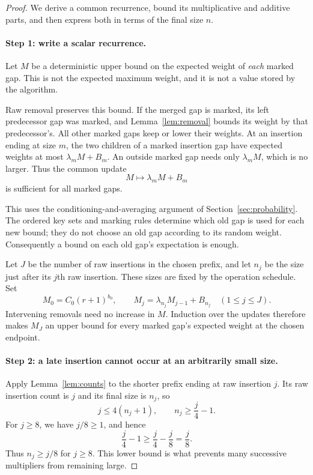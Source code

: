 \documentclass[11pt,a4paper]{article}
\theoremstyle{readable}
\begin{document}
\begin{proof}
We derive a common recurrence, bound its multiplicative and additive
parts, and then express both in terms of the final size $n$.

\paragraph{Step 1: write a scalar recurrence.}
Let $M$ be a deterministic upper bound on the expected weight of
\emph{each} marked gap. This is not the expected maximum weight,
and it is not a value stored by the algorithm.

Raw removal preserves this bound. If the merged gap is marked, its
left predecessor gap was marked, and Lemma~\ref{lem:removal} bounds
its weight by that predecessor's. All other marked gaps keep or lower
their weights. At an insertion ending at size $m$, the two children
of a marked insertion gap have expected weights at most
$\lambda_m M+B_m$. An outside marked gap needs only $\lambda_m M$,
which is no larger. Thus the common update
\[
  M\longmapsto\lambda_m M+B_m
\]
is sufficient for all marked gaps.

This uses the conditioning-and-averaging argument of
Section~\ref{sec:probability}. The ordered key sets and marking rules
determine which old gap is used for each new bound; they do not choose
an old gap according to its random weight. Consequently a bound on
each old gap's expectation is enough.

Let $J$ be the number of raw insertions in the chosen prefix, and let
$n_j$ be the size just after its $j$th raw insertion. These sizes are
fixed by the operation schedule. Set
\begin{equation}
  M_0=C_0(r+1)^{b_0},\qquad
  M_j=\lambda_{n_j}M_{j-1}+B_{n_j}\quad(1\le j\le J).
  \label{eq:M-recurrence}
\end{equation}
Intervening removals need no increase in $M$. Induction over the
updates therefore makes $M_J$ an upper bound for every marked gap's
expected weight at the chosen endpoint.

\paragraph{Step 2: a late insertion cannot occur at an arbitrarily small size.}
Apply Lemma~\ref{lem:counts} to the shorter prefix ending at raw
insertion $j$. Its raw insertion count is $j$ and its final size is
$n_j$, so
\[
  j\le4(n_j+1),\qquad n_j\ge\frac j4-1.
\]
For $j\ge8$, we have $j/8\ge1$, and hence
\[
  \frac j4-1\ge\frac j4-\frac j8=\frac j8.
\]
Thus $n_j\ge j/8$ for $j\ge8$. This lower bound is what prevents
many successive multipliers from remaining large.


\end{proof}
\end{document}
